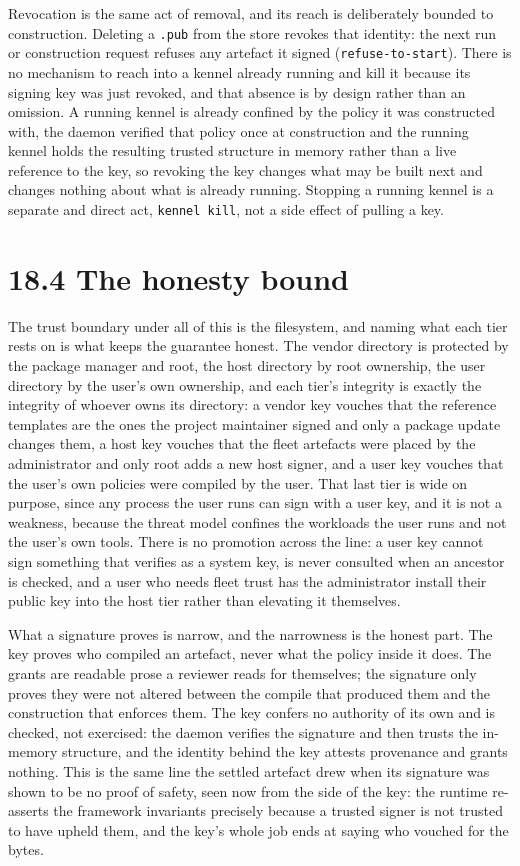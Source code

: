 Revocation is the same act of removal, and its reach is deliberately
bounded to construction. Deleting a \texttt{.pub} from the store revokes
that identity: the next run or construction request refuses any artefact
it signed (\texttt{refuse-to-start}). There is no mechanism to reach
into a kennel already running and kill it because its signing key was
just revoked, and that absence is by design rather than an omission. A
running kennel is already confined by the policy it was constructed
with, the daemon verified that policy once at construction and the
running kennel holds the resulting trusted structure in memory rather
than a live reference to the key, so revoking the key changes what may
be built next and changes nothing about what is already running.
Stopping a running kennel is a separate and direct act,
\texttt{kennel\ kill}, not a side effect of pulling a key.

\hypertarget{the-honesty-bound}{%
\section{18.4 The honesty bound}\label{the-honesty-bound}}

The trust boundary under all of this is the filesystem, and naming what
each tier rests on is what keeps the guarantee honest. The vendor
directory is protected by the package manager and root, the host
directory by root ownership, the user directory by the user's own
ownership, and each tier's integrity is exactly the integrity of whoever
owns its directory: a vendor key vouches that the reference templates
are the ones the project maintainer signed and only a package update
changes them, a host key vouches that the fleet artefacts were placed by
the administrator and only root adds a new host signer, and a user key
vouches that the user's own policies were compiled by the user. That
last tier is wide on purpose, since any process the user runs can sign
with a user key, and it is not a weakness, because the threat model
confines the workloads the user runs and not the user's own tools. There
is no promotion across the line: a user key cannot sign something that
verifies as a system key, is never consulted when an ancestor is
checked, and a user who needs fleet trust has the administrator install
their public key into the host tier rather than elevating it themselves.

What a signature proves is narrow, and the narrowness is the honest
part. The key proves who compiled an artefact, never what the policy
inside it does. The grants are readable prose a reviewer reads for
themselves; the signature only proves they were not altered between the
compile that produced them and the construction that enforces them. The
key confers no authority of its own and is checked, not exercised: the
daemon verifies the signature and then trusts the in-memory structure,
and the identity behind the key attests provenance and grants nothing.
This is the same line the settled artefact drew when its signature was
shown to be no proof of safety, seen now from the side of the key: the
runtime re-asserts the framework invariants precisely because a trusted
signer is not trusted to have upheld them, and the key's whole job ends
at saying who vouched for the bytes.
